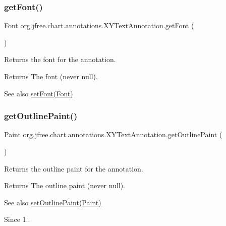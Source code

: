 \subsubsection{\texorpdfstring{get\+Font()}{getFont()}}
{\footnotesize\ttfamily Font org.\+jfree.\+chart.\+annotations.\+X\+Y\+Text\+Annotation.\+get\+Font (\begin{DoxyParamCaption}{ }\end{DoxyParamCaption})}

Returns the font for the annotation.

\begin{DoxyReturn}{Returns}
The font (never {\ttfamily null}).
\end{DoxyReturn}
\begin{DoxySeeAlso}{See also}
\mbox{\hyperlink{classorg_1_1jfree_1_1chart_1_1annotations_1_1_x_y_text_annotation_a256be6c8fcc2c4804f71bcd3633326b0}{set\+Font(\+Font)}} 
\end{DoxySeeAlso}
\mbox{\label{classorg_1_1jfree_1_1chart_1_1annotations_1_1_x_y_text_annotation_a1ab87e5e927bca22a4439a37b353d4f1}} 
\subsubsection{\texorpdfstring{get\+Outline\+Paint()}{getOutlinePaint()}}
{\footnotesize\ttfamily Paint org.\+jfree.\+chart.\+annotations.\+X\+Y\+Text\+Annotation.\+get\+Outline\+Paint (\begin{DoxyParamCaption}{ }\end{DoxyParamCaption})}

Returns the outline paint for the annotation.

\begin{DoxyReturn}{Returns}
The outline paint (never {\ttfamily null}).
\end{DoxyReturn}
\begin{DoxySeeAlso}{See also}
\mbox{\hyperlink{classorg_1_1jfree_1_1chart_1_1annotations_1_1_x_y_text_annotation_a91879f03695e989564897cf72d219d22}{set\+Outline\+Paint(\+Paint)}}
\end{DoxySeeAlso}
\begin{DoxySince}{Since}
1.. 
\end{DoxySince}
\mbox{\label{classorg_1_1jfree_1_1chart_1_1annotations_1_1_x_y_text_annotation_a00d8dc7b42c84f629ffa430271a24e6b}} 
